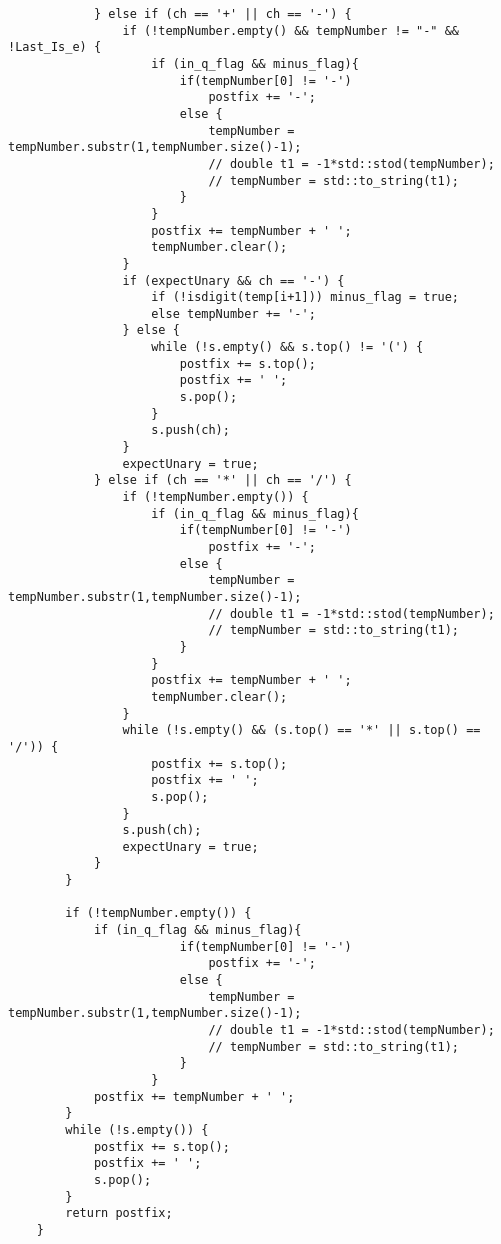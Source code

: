 \documentclass[UTF8]{ctexart}
\begin{document}
\begin{lstlisting}
            } else if (ch == '+' || ch == '-') {
                if (!tempNumber.empty() && tempNumber != "-" && !Last_Is_e) {
                    if (in_q_flag && minus_flag){
                        if(tempNumber[0] != '-')
                            postfix += '-';
                        else {
                            tempNumber = tempNumber.substr(1,tempNumber.size()-1);
                            // double t1 = -1*std::stod(tempNumber);
                            // tempNumber = std::to_string(t1);
                        }
                    }
                    postfix += tempNumber + ' ';
                    tempNumber.clear();
                }
                if (expectUnary && ch == '-') {
                    if (!isdigit(temp[i+1])) minus_flag = true;
                    else tempNumber += '-';
                } else {
                    while (!s.empty() && s.top() != '(') {
                        postfix += s.top();
                        postfix += ' ';
                        s.pop();
                    }
                    s.push(ch);
                }
                expectUnary = true;
            } else if (ch == '*' || ch == '/') {
                if (!tempNumber.empty()) {
                    if (in_q_flag && minus_flag){
                        if(tempNumber[0] != '-')
                            postfix += '-';
                        else {
                            tempNumber = tempNumber.substr(1,tempNumber.size()-1);
                            // double t1 = -1*std::stod(tempNumber);
                            // tempNumber = std::to_string(t1);
                        }
                    }
                    postfix += tempNumber + ' ';
                    tempNumber.clear();
                }
                while (!s.empty() && (s.top() == '*' || s.top() == '/')) {
                    postfix += s.top();
                    postfix += ' ';
                    s.pop();
                }
                s.push(ch);
                expectUnary = true;
            }
        }
    
        if (!tempNumber.empty()) {
            if (in_q_flag && minus_flag){
                        if(tempNumber[0] != '-')
                            postfix += '-';
                        else {
                            tempNumber = tempNumber.substr(1,tempNumber.size()-1);
                            // double t1 = -1*std::stod(tempNumber);
                            // tempNumber = std::to_string(t1);
                        }
                    }
            postfix += tempNumber + ' ';
        }
        while (!s.empty()) {
            postfix += s.top();
            postfix += ' ';
            s.pop();
        }
        return postfix;
    }
    

\end{lstlisting}
\end{document}
